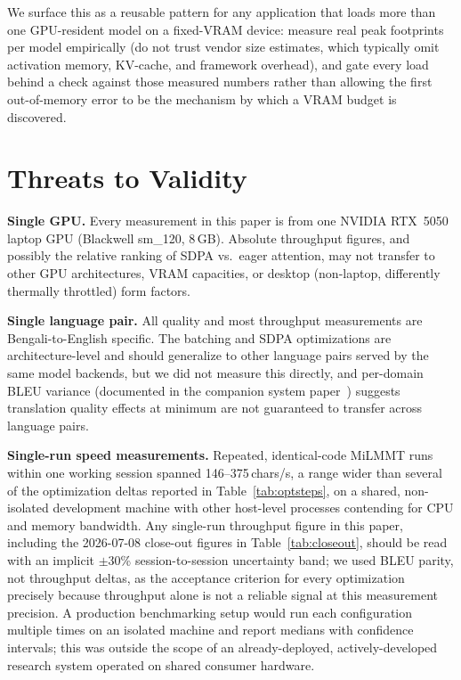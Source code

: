 \documentclass[conference]{IEEEtran}
\begin{document}
We surface this as a reusable pattern for any application that loads
more than one GPU-resident model on a fixed-VRAM device: measure real
peak footprints per model empirically (do not trust vendor size
estimates, which typically omit activation memory, KV-cache, and
framework overhead), and gate every load behind a check against those
measured numbers rather than allowing the first out-of-memory error to be
the mechanism by which a VRAM budget is discovered.

\section{Threats to Validity}
\label{sec:threats}

\textbf{Single GPU.} Every measurement in this paper is from one NVIDIA
RTX~5050 laptop GPU (Blackwell sm\_120, 8\,GB). Absolute throughput
figures, and possibly the relative ranking of SDPA vs.\ eager attention,
may not transfer to other GPU architectures, VRAM capacities, or desktop
(non-laptop, differently thermally throttled) form factors.

\textbf{Single language pair.} All quality and most throughput
measurements are Bengali-to-English specific. The batching and SDPA
optimizations are architecture-level and should generalize to other
language pairs served by the same model backends, but we did not measure
this directly, and per-domain BLEU variance (documented in the companion
system paper~\cite{biswas2025bnentr}) suggests translation quality
effects at minimum are not guaranteed to transfer across language pairs.

\textbf{Single-run speed measurements.} Repeated, identical-code MiLMMT
runs within one working session spanned 146--375\,chars/s, a range wider
than several of the optimization deltas reported in
Table~\ref{tab:optsteps}, on a shared, non-isolated development machine
with other host-level processes contending for CPU and memory bandwidth.
Any single-run throughput figure in this paper, including the 2026-07-08
close-out figures in Table~\ref{tab:closeout}, should be read with an
implicit $\pm$30\% session-to-session uncertainty band; we used BLEU
parity, not throughput deltas, as the acceptance criterion for every
optimization precisely because throughput alone is not a reliable signal
at this measurement precision. A production benchmarking setup would run
each configuration multiple times on an isolated machine and report
medians with confidence intervals; this was outside the scope of an
already-deployed, actively-developed research system operated on shared
consumer hardware.
\end{document}
